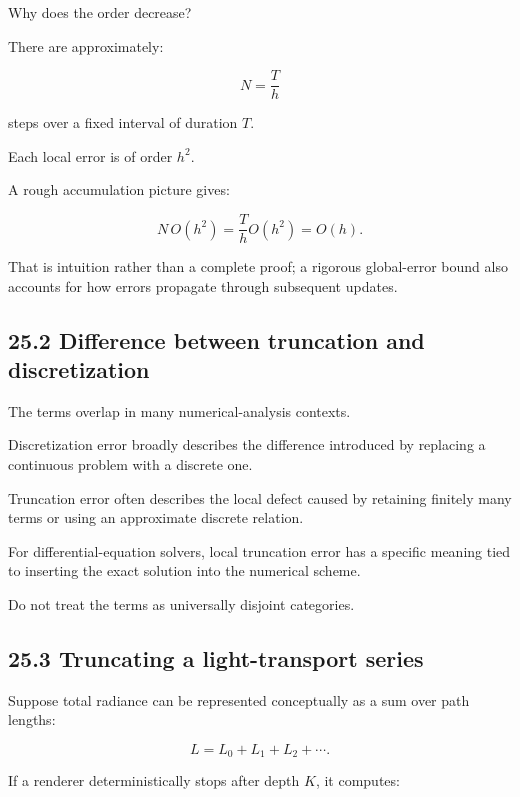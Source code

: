 Why does the order decrease?

There are approximately:

\[ N=\frac Th \]

steps over a fixed interval of duration \(T\).

Each local error is of order \(h^2\).

A rough accumulation picture gives:

\[ N\,O(h^2) = \frac Th O(h^2) = O(h). \]

That is intuition rather than a complete proof; a rigorous global-error bound also accounts for how errors propagate through subsequent updates.

\subsection{25.2 Difference between truncation and discretization}\label{02-foundations-ii-ch029-difference-between-truncation-and-discretization}

\hypertarget{02-foundations-ii-ch029-difference-between-truncation-and-discretization}{}

The terms overlap in many numerical-analysis contexts.

Discretization error broadly describes the difference introduced by replacing a continuous problem with a discrete one.

Truncation error often describes the local defect caused by retaining finitely many terms or using an approximate discrete relation.

For differential-equation solvers, local truncation error has a specific meaning tied to inserting the exact solution into the numerical scheme.

Do not treat the terms as universally disjoint categories.

\subsection{25.3 Truncating a light-transport series}\label{02-foundations-ii-ch029-truncating-a-light-transport-series}

\hypertarget{02-foundations-ii-ch029-truncating-a-light-transport-series}{}

Suppose total radiance can be represented conceptually as a sum over path lengths:

\[ L=L_0+L_1+L_2+\cdots. \]

If a renderer deterministically stops after depth \(K\), it computes:

